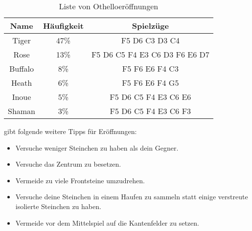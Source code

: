 \begin{table}[h]
  \centering
  \begin{tabular}{| c | c | c |}
    \hline
     Name & Häufigkeit & Spielzüge \\ \hline
     Tiger  &   47\%   & F5 D6 C3 D3 C4 \\ \hline
     Rose &   13\%   & F5 D6 C5 F4 E3 C6 D3 F6 E6 D7 \\ \hline
     Buffalo &  8\%    & F5 F6 E6 F4 C3 \\ \hline
     Heath  &  6\%    &  F5 F6 E6 F4 G5 \\ \hline
     Inoue &   5\%   &  F5 D6 C5 F4 E3 C6 E6\\ \hline
     Shaman &   3\%   & F5 D6 C5 F4 E3 C6 F3 \\ \hline
  \end{tabular}
  \caption{Liste von Othelloeröffnungen \cite{Ortiz.}}
  \label{tab:eroeffnungen}
\end{table}
\cite{Ortiz.} gibt folgende weitere Tipps für Eröffnungen:
\begin{itemize}
\item Versuche weniger Steinchen zu haben als dein Gegner.
\item Versuche das Zentrum zu besetzen.
\item Vermeide zu viele Frontsteine umzudrehen.
\item Versuche deine Steinchen in einem Haufen zu sammeln statt einige verstreute isolierte Steinchen zu haben.
\item Vermeide vor dem Mittelspiel auf die Kantenfelder zu setzen.
\end{itemize}
